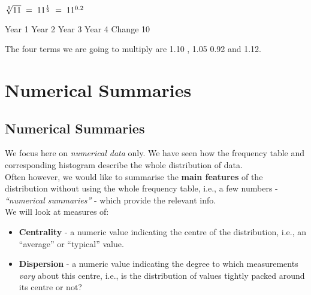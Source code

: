 $\sqrt[5]{11} \;= \; 11^{1 \over 5} \;= \; 11^{0.2} $



Year 1 Year 2 Year 3 Year 4
Change 10%


The four terms we are going to multiply are
1.10 , 1.05 0.92 and 1.12.








\section{Numerical Summaries}
\subsection{Numerical Summaries}
\begin{frame}{\bf {}}
We focus here on \emph{numerical data} only. We have seen how the frequency table and corresponding histogram describe the whole distribution of data.\\[0.4cm]
Often however, we would like to summarise the {\bf main features} of the distribution without using the whole frequency table, i.e., a few numbers - \emph{``numerical summaries''} - which provide the relevant info.\\[0.5cm]
We will look at measures of:
\begin{itemize}\itemsep0.4cm
\item {\bf Centrality} - a numeric value indicating the centre of the distribution, i.e., an ``average'' or ``typical'' value.
\item {\bf Dispersion} - a numeric value indicating the degree to which measurements \emph{vary} about this centre, i.e., is the distribution of values tightly packed around its centre or not?
\end{itemize}

\end{frame}

